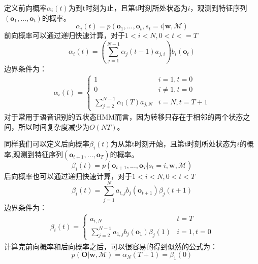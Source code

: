 定义前向概率$\alpha_i(t)$为到t时刻为止，且第t时刻所处状态为$i$，观测到特征序列$\left( \mathbf{o}_1, \dots, \mathbf{o}_t \right)$的概率。
\begin{equation}
\alpha_i(t)=p(\mathbf{o}_1, \dots, \mathbf{o}_t,s_t=i|\mathbf{w}, \mathcal{M})
\end{equation}
前向概率可以通过递归快速计算，对于$1<i<N, 0<t<=T$
\begin{equation}
\alpha_i(t)=(\sum_{j=1}^{N-1}\alpha_j(t-1)a_{j,i})b_i(\mathbf{o}_t)
\end{equation}
边界条件为：
\begin{eqnarray}
\alpha_i(t)=
\begin{cases}
1& i=1,t=0 \\
0& i \ne 1,t=0 \\
\sum_{j=2}^{N-1}\alpha_i(T)a_{j,N}& i=N, t=T+1
\end{cases}
\end{eqnarray}
对于常用于语音识别的五状态HMM而言，因为转移只存在于相邻的两个状态之间，所以时间复杂度减少为$O(NT)$。

同样我们可以定义后向概率$\beta_i(t)$为从第t时刻开始，且第t时刻所处状态为$i$的概率,观测到特征序列$\left( \mathbf{o}_{t+1}, \dots, \mathbf{o}_T \right)$的概率。
\begin{equation}
\beta_i(t)=p(\mathbf{o}_{t+1},...,\mathbf{o}_T|s_t=i, \mathbf{w}, \mathcal{M})
\end{equation}
后向概率也可以通过递归快速计算，对于$1<i<N, 0<t<T$
\begin{equation}
\beta_i(t)=\sum_{j=1}^{N} a_{i,j} b_j(\mathbf{o}_{t+1}) \beta_j(t+1)
\end{equation}
边界条件为：
\begin{eqnarray}
\beta_i(t)=
\begin{cases}
a_{i,N} & t=T \\
\sum_{j=2}^{N-1} a_{1,j} b_j(\mathbf{o}_{1}) \beta_j(1) & i=1, t=0
\end{cases}
\end{eqnarray}
计算完前向概率和后向概率之后，可以很容易的得到似然的公式为：
\begin{equation}
    p(\mathbf{O}|\mathbf{w}, \mathcal{M})=\alpha_N(T+1)=\beta_1(0)
\end{equation}


